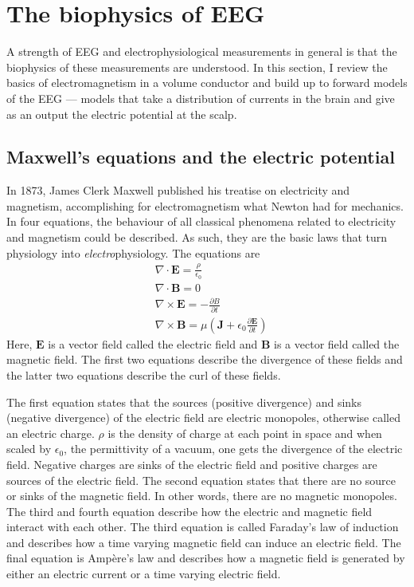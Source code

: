 \section{The biophysics of EEG} \label{sec:EM_theory}

A strength of EEG and electrophysiological measurements in general is that the biophysics of these measurements are understood. In this section, I review the basics of electromagnetism in a volume conductor and build up to forward models of the EEG --- models that take a distribution of currents in the brain and give as an output the electric potential at the scalp.

\subsection{Maxwell's equations and the electric potential}
In 1873, James Clerk Maxwell published his treatise on electricity and magnetism, accomplishing for electromagnetism what Newton had for mechanics. In four equations, the behaviour of all classical phenomena related to electricity and magnetism could be described. As such, they are the basic laws that turn physiology into \textit{electro}physiology. The equations are
\begin{align*}
    & \nabla \cdot \bm{E} = \frac{\rho}{\epsilon_0} \\
    & \nabla \cdot \bm{B} = 0 \\
    & \nabla \times \bm{E} = - \frac{\partial {B}}{\partial t} \\
    & \nabla \times \bm{B} = \mu \left( \bm{J} + \epsilon_0 \frac{\partial \bm{E}}{\partial t} \right)
\end{align*}
Here, $\bm{E}$ is a vector field called the electric field and $\bm{B}$ is a vector field called the magnetic field. The first two equations describe the divergence of these fields and the latter two equations describe the curl of these fields. 

The first equation states that the sources (positive divergence) and sinks (negative divergence) of the electric field are electric monopoles, otherwise called an electric charge. $\rho$ is the density of charge at each point in space and when scaled by $\epsilon_0$, the permittivity of a vacuum, one gets the divergence of the electric field. Negative charges are sinks of the electric field and positive charges are sources of the electric field. The second equation states that there are no source or sinks of the magnetic field. In other words, there are no magnetic monopoles. The third and fourth equation describe how the electric and magnetic field interact with each other. The third equation is called Faraday's law of induction and describes how a time varying magnetic field can induce an electric field. The final equation is Ampère's law and describes how a magnetic field is generated by either an electric current or a time varying electric field.

